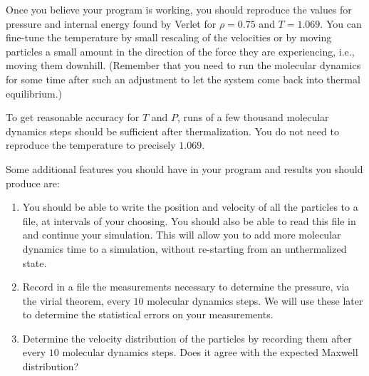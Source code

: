 Once you believe your program is working, you should reproduce the values for pressure and
internal energy found by Verlet for \(\rho = 0.75\) and \(T = 1.069\). You can fine-tune the
temperature by small rescaling of the velocities or by moving particles a small amount in
the direction of the force they are experiencing, i.e., moving them downhill. (Remember that
you need to run the molecular dynamics for some time after such an adjustment to let the
system come back into thermal equilibrium.)

To get reasonable accuracy for \(T\) and \(P\), runs of a few thousand molecular dynamics steps
should be sufficient after thermalization. You do not need to reproduce the temperature to
precisely \(1.069\).

Some additional features you should have in your program and results you should produce are:

\begin{enumerate}
    \item You should be able to write the position and velocity of all the particles to a
          file, at intervals of your choosing. You should also be able to read this file in
          and continue your simulation. This will allow you to add more molecular dynamics
          time to a simulation, without re-starting from an unthermalized state.
    \item Record in a file the measurements necessary to determine the pressure, via the
          virial theorem, every \(10\) molecular dynamics steps. We will use these later to
          determine the statistical errors on your measurements.
    \item Determine the velocity distribution of the particles by recording them after every
          \(10\) molecular dynamics steps. Does it agree with the expected Maxwell distribution?
\end{enumerate}
